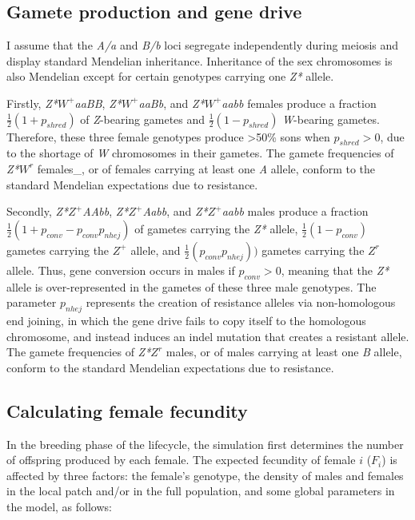 \documentclass[]{rsos}%
\begin{document}
\hypertarget{gamete-production-and-gene-drive}{%
\subsection{Gamete production and gene
drive}\label{gamete-production-and-gene-drive}}

I assume that the \emph{A/a} and \emph{B/b} loci segregate independently
during meiosis and display standard Mendelian inheritance. Inheritance
of the sex chromosomes is also Mendelian except for certain genotypes
carrying one \emph{Z*} allele.

Firstly, \emph{Z*}\(W^+\)\emph{aaBB}, \emph{Z*}\(W^+\)\emph{aaBb}, and
\emph{Z*}\(W^+\)\emph{aabb} females produce a fraction
\(\frac{1}{2}(1 + p_{shred})\) of \emph{Z}-bearing gametes and
\(\frac{1}{2}(1 - p_{shred})\) \emph{W}-bearing gametes. Therefore,
these three female genotypes produce \textgreater{}50\% sons when
\(p_{shred} > 0\), due to the shortage of \emph{W} chromosomes in their
gametes. The gamete frequencies of \emph{Z*}\(W^r\) females\_, or of
females carrying at least one \emph{A} allele, conform to the standard
Mendelian expectations due to resistance.

Secondly, \emph{Z*}\(Z^+\)\emph{AAbb}, \emph{Z*}\(Z^+\)\emph{Aabb}, and
\emph{Z*}\(Z^+\)\emph{aabb} males produce a fraction
\(\frac{1}{2}(1 + p_{conv} - p_{conv} p_{nhej})\) of gametes carrying
the \emph{Z*} allele, \(\frac{1}{2}(1 - p_{conv})\) gametes carrying the
\(Z^+\) allele, and \(\frac{1}{2}(p_{conv} p_{nhej}))\) gametes carrying
the \(Z^r\) allele. Thus, gene conversion occurs in males if
\(p_{conv} > 0\), meaning that the \emph{Z*} allele is over-represented
in the gametes of these three male genotypes. The parameter \(p_{nhej}\)
represents the creation of resistance alleles via non-homologous end
joining, in which the gene drive fails to copy itself to the homologous
chromosome, and instead induces an indel mutation that creates a
resistant allele. The gamete frequencies of \emph{Z*}\(Z^r\) males, or
of males carrying at least one \emph{B} allele, conform to the standard
Mendelian expectations due to resistance.

\hypertarget{calculating-female-fecundity}{%
\subsection{Calculating female
fecundity}\label{calculating-female-fecundity}}

In the breeding phase of the lifecycle, the simulation first determines
the number of offspring produced by each female. The expected fecundity
of female \(i\) (\(F_i\)) is affected by three factors: the female's
genotype, the density of males and females in the local patch and/or in
the full population, and some global parameters in the model, as
follows:
\end{document}
